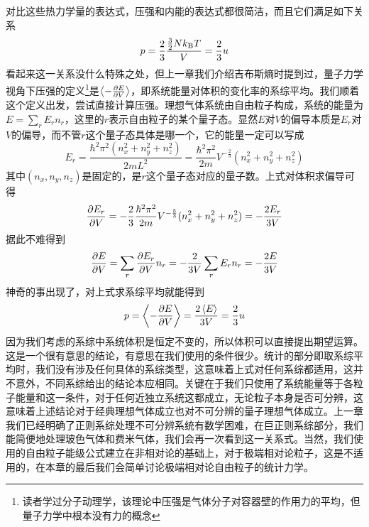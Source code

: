 \documentclass[../../main.tex]{subfiles}
\begin{document}
对比这些热力学量的表达式，压强和内能的表达式都很简洁，而且它们满足如下关系
\begin{equation}
    p=\frac{2}{3}\frac{\frac{3}{2}Nk_{\mathrm{B}} T}{V}=\frac{2}{3}u
\end{equation}
看起来这一关系没什么特殊之处，但上一章我们介绍吉布斯熵时提到过，量子力学视角下压强的定义\footnote{读者学过分子动理学，该理论中压强是气体分子对容器壁的作用力的平均，但量子力学中根本没有力的概念}是\(\expval{-\pdv{E}{V}}\)，即系统能量对体积的变化率的系综平均。我们顺着这个定义出发，尝试直接计算压强。理想气体系统由自由粒子构成，系统的能量为\(E=\sum_r E_rn_r\)，这里的\(r\)表示自由粒子的某个量子态。显然\(E\)对\(V\)的偏导本质是\(E_r\)对\(V\)的偏导，而不管\(r\)这个量子态具体是哪一个，它的能量一定可以写成
\begin{equation}
    E_r=\frac{\hbar^2\pi^2(n_x^2+n_y^2+n_z^2)}{2mL^2}=\frac{\hbar^2\pi^2}{2m}V^{-\frac{2}{3}}(n_x^2+n_y^2+n_z^2)
\end{equation}
其中\((n_x,n_y,n_z)\)是固定的，是\(r\)这个量子态对应的量子数。上式对体积求偏导可得
\begin{equation}
    \pdv{E_r}{V}=-\frac{2}{3}\frac{\hbar^2\pi^2}{2m}V^{-\frac{5}{3}}(n_x^2+n_y^2+n_z^2)=-\frac{2E_r}{3V}
\end{equation}
据此不难得到
\begin{equation}
    \pdv{E}{V}=\sum_r \pdv{E_r}{V}n_r=-\frac{2}{3V}\sum_r E_rn_r=-\frac{2E}{3V}
\end{equation}
神奇的事出现了，对上式求系综平均就能得到
\begin{equation}\label{eq:非相对论压强内能关系}
    p=\expval{-\pdv{E}{V}}=\frac{2\expval{E}}{3V}=\frac{2}{3}u
\end{equation}
因为我们考虑的系综中系统体积是恒定不变的，所以体积可以直接提出期望运算。这是一个很有意思的结论，有意思在我们使用的条件很少。统计的部分即取系综平均时，我们没有涉及任何具体的系综类型，这意味着上式对任何系综都适用，这并不意外，不同系综给出的结论本应相同。关键在于我们只使用了系统能量等于各粒子能量和这一条件，对于任何近独立系统这都成立，无论粒子本身是否可分辨，这意味着上述结论对于经典理想气体成立也对不可分辨的量子理想气体成立。上一章我们已经明确了正则系综处理不可分辨系统有数学困难，在巨正则系综部分，我们能简便地处理玻色气体和费米气体，我们会再一次看到这一关系式。当然，我们使用的自由粒子能级公式建立在非相对论的基础上，对于极端相对论粒子，这是不适用的，在本章的最后我们会简单讨论极端相对论自由粒子的统计力学。
\end{document}
